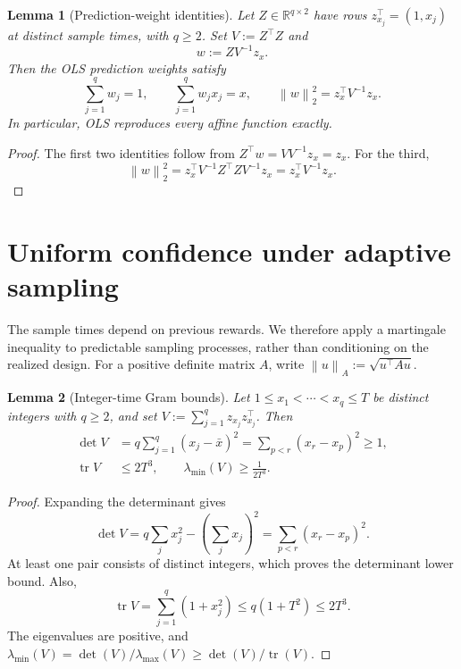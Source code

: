 \documentclass[11pt]{article}
\newtheorem{lemma}[lemma]{Lemma}
\theoremstyle{remark}
\newcommand{\R}{\mathbb R}
\newcommand{\norm}[1]{\left\lVert #1\right\rVert}
\newcommand{\tr}{\operatorname{tr}}
\begin{document}
\begin{samepage}
\begin{lemma}[Prediction-weight identities]\label{lem:weights-app}
Let $Z\in\R^{q\times2}$ have rows $z_{x_j}^\top=(1,x_j)$ at distinct sample
times, with $q\ge2$. Set $V:=Z^\top Z$ and
\[
w:=ZV^{-1}z_x.
\]
Then the OLS prediction weights satisfy
\begin{equation}\label{eq:weight-identities-app}
\sum_{j=1}^q w_j=1,
\qquad
\sum_{j=1}^q w_jx_j=x,
\qquad
\norm{w}_2^2=z_x^\top V^{-1}z_x.
\end{equation}
In particular, OLS reproduces every affine function exactly.
\end{lemma}
\end{samepage}

\begin{proof}
The first two identities follow from $Z^\top w=VV^{-1}z_x=z_x$. For the third,
\[
\norm{w}_2^2
=z_x^\top V^{-1}Z^\top ZV^{-1}z_x
=z_x^\top V^{-1}z_x.
\]
\end{proof}

\section{Uniform confidence under adaptive sampling}\label{app:confidence}

The sample times depend on previous rewards. We therefore apply a martingale
inequality to predictable sampling processes, rather than conditioning on the
realized design. For a positive definite matrix $A$, write
$\norm{u}_A:=\sqrt{u^\top Au}$.

\begin{samepage}
\begin{lemma}[Integer-time Gram bounds]\label{lem:gram-app}
Let $1\le x_1<\cdots<x_q\le T$ be distinct integers with $q\ge2$, and set
$V:=\sum_{j=1}^q z_{x_j}z_{x_j}^\top$. Then
\begin{align}
\det V
&=q\sum_{j=1}^q(x_j-\bar x)^2
=\sum_{p<r}(x_r-x_p)^2
\ge1,\label{eq:det-gram-app}\\
\tr V&\le2T^3,
\qquad
\lambda_{\min}(V)\ge\frac1{2T^3}.
\label{eq:trace-gram-app}
\end{align}
\end{lemma}
\end{samepage}

\begin{proof}
Expanding the determinant gives
\[
\det V
=q\sum_jx_j^2-\left(\sum_jx_j\right)^2
=\sum_{p<r}(x_r-x_p)^2.
\]
At least one pair consists of distinct integers, which proves the determinant
lower bound. Also,
\[
\tr V=\sum_{j=1}^q(1+x_j^2)
\le q(1+T^2)\le2T^3.
\]
The eigenvalues are positive, and
$\lambda_{\min}(V)=\det(V)/\lambda_{\max}(V)\ge\det(V)/\tr(V)$.
\end{proof}
\end{document}
